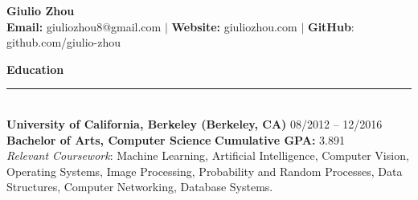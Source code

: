 \documentclass{article}
\begin{document}
\newcommand{\HRule}{\rule{\linewidth}{0.2mm}}


\begin{center}
\textbf{{\LARGE Giulio Zhou}} \\ 
\textbf{\fontsize{11}{13.2} Email:} giuliozhou8@gmail.com  $|$ \textbf{Website:} giuliozhou.com $|$ \textbf{GitHub}: github.com/giulio-zhou\\[2mm]
\end{center}


\normalsize
\noindent
\textbf{{\Large Education}}\\[-2mm]
\HRule\\
\textbf{University of California, Berkeley (Berkeley, CA)}
\hfill 08/2012 -- 12/2016 \\
\indent
\textbf{Bachelor of Arts, Computer Science}  
\hfill{\textbf{Cumulative GPA: }3.891}\\
\textit{Relevant Coursework}: Machine Learning, Artificial Intelligence, Computer Vision, Operating Systems, Image Processing, Probability and Random Processes, Data Structures, Computer Networking, Database Systems.
\\
\end{document}
